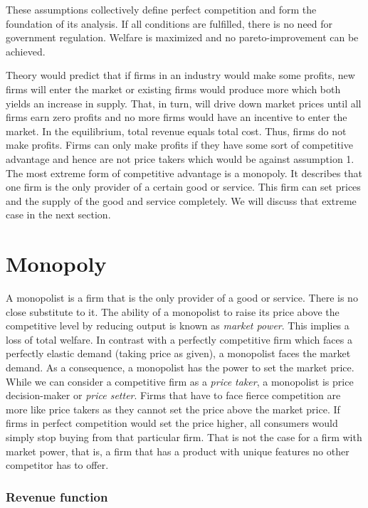 \documentclass[
  12pt,
  oneside]{book}
\theoremstyle{definition}
\theoremstyle{definition}
\theoremstyle{definition}
\theoremstyle{definition}
\theoremstyle{remark}
\begin{document}
These assumptions collectively define perfect competition and form the foundation of its analysis. If all conditions are fulfilled, there is no need for government regulation. Welfare is maximized and no pareto-improvement can be achieved.

Theory would predict that if firms in an industry would make some profits, new firms will enter the market or existing firms would produce more which both yields an increase in supply. That, in turn, will drive down market prices until all firms earn zero profits and no more firms would have an incentive to enter the market. In the equilibrium, total revenue equals total cost. Thus, firms do not make profits. Firms can only make profits if they have some sort of competitive advantage and hence are not price takers which would be against assumption 1. The most extreme form of competitive advantage is a monopoly. It describes that one firm is the only provider of a certain good or service. This firm can set prices and the supply of the good and service completely. We will discuss that extreme case in the next section.

\hypertarget{monopoly}{%
\section{Monopoly}\label{monopoly}}

A monopolist is a firm that is the only provider of a good or service. There is no close substitute to it.
The ability of a monopolist to raise its price above the competitive level by reducing output is known as \emph{market power}. This implies a loss of total welfare.
In contrast with a perfectly competitive firm which faces a perfectly elastic demand (taking
price as given), a monopolist faces the market demand. As a consequence, a monopolist has the power to set the market price. While we can consider a
competitive firm as a \emph{price taker}, a monopolist is price decision-maker or \emph{price setter}.
Firms that have to face fierce competition are more like price takers as they cannot set the price above the market price. If firms in perfect competition would set the price higher, all consumers would simply stop buying from that particular firm. That is not the case for a firm with market power, that is, a firm that has a product with unique features no other competitor has to offer.

\hypertarget{revenue-function}{%
\subsubsection*{Revenue function}\label{revenue-function}}
\end{document}
